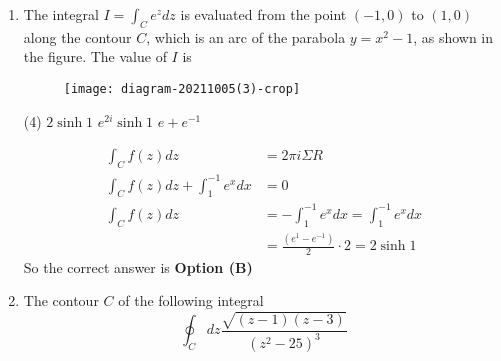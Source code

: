 \begin{enumerate}[label=\color{ocre}\textbf{\arabic*.}]
\begin{answer}
\begin{align*}
		z&=0,1,-1, \frac{\pi i}{4}, \frac{-\pi i}{4}\\
		f(z)&=\frac{2 z-\frac{1}{3}(2 z)^{3}+\frac{2}{15}(2 z)^{5} \ldots .}{z\left(\pi z-\frac{\pi^{3} z^{3}}{3 !}+\ldots\right)}\\
		\frac{2}{\pi z}&\left(1-\frac{1}{2} z^{2}+\ldots\right)\left(1-\frac{\pi^{2} z^{2}}{2 !}+\ldots\right)\\
		b_{1}&=\frac{2}{\pi}\\
		\text{As Re } z&=1, \frac{\tanh ^{2}}{-\pi}\text{ and }\operatorname{Re} z=-1, \frac{\tanh ^{2}}{-\pi}\\
		\operatorname{Re} z&=\frac{i \pi}{4}=-\frac{1}{\pi}\left(2 \operatorname{cosec} h \frac{\pi^{2}}{4}\right)\\
		\operatorname{Re} z&=\frac{-i \pi}{4}=-\frac{1}{\pi}\left(2 \operatorname{cosec} \mathrm{h} \frac{\pi^{2}}{4}\right)
		\intertext{$I=2 \pi i \Sigma R=4 i$ only when 0 lies inside, otherwise wrong question.}
		\end{align*}
		So the correct answer is \textbf{Option (B)}
	\end{answer}
	\item The integral $I=\int_{C} e^{z} d z$ is evaluated from the point $(-1,0)$ to $(1,0)$ along the contour $C$, which is an arc of the parabola $y=x^{2}-1$, as shown in the figure. The value of $I$ is
	{}
	\begin{figure}[H]
		\centering
		\texttt{[image: diagram-20211005(3)-crop]}
	\end{figure}
	\begin{tasks}(4)
		\task[\textbf{B.}] $2 \sinh 1$
		\task[\textbf{C.}]  $e^{2 i} \sinh 1$
		\task[\textbf{D.}] $e+e^{-1}$
	\end{tasks}
	\begin{answer}
		\begin{align*}
		\int_{C} f(z) d z&=2 \pi i \Sigma R\\
		\int_{C} f(z) d z+\int_{1}^{-1} e^{x} d x&=0\\
		\int_{C} f(z) d z&=-\int_{1}^{-1} e^{x} d x=\int_{1}^{-1} e^{x} d x\\&=\frac{\left(e^{1}-e^{-1}\right)}{2} \cdot 2=2 \sinh 1
		\end{align*}
		So the correct answer is \textbf{Option (B)}
	\end{answer}
	\item The contour $C$ of the following integral
	$$
	\oint_{C} d z \frac{\sqrt{(z-1)(z-3)}}{\left(z^{2}-25\right)^{3}}
$$
\end{enumerate}
